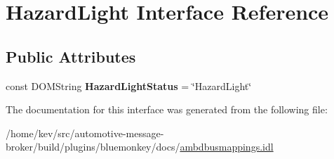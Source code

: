 \hypertarget{interfaceHazardLight}{\section{Hazard\+Light Interface Reference}
\label{interfaceHazardLight}
}
\subsection*{Public Attributes}
\begin{DoxyCompactItemize}
\item 
\hypertarget{interfaceHazardLight_a12e9aaf0ed97600798da9564cba431f2}{const D\+O\+M\+String {\bfseries Hazard\+Light\+Status} = \char`\"{}Hazard\+Light\char`\"{}}\label{interfaceHazardLight_a12e9aaf0ed97600798da9564cba431f2}

\end{DoxyCompactItemize}


The documentation for this interface was generated from the following file\+:\begin{DoxyCompactItemize}
\item 
/home/kev/src/automotive-\/message-\/broker/build/plugins/bluemonkey/docs/\hyperlink{ambdbusmappings_8idl}{ambdbusmappings.\+idl}\end{DoxyCompactItemize}
